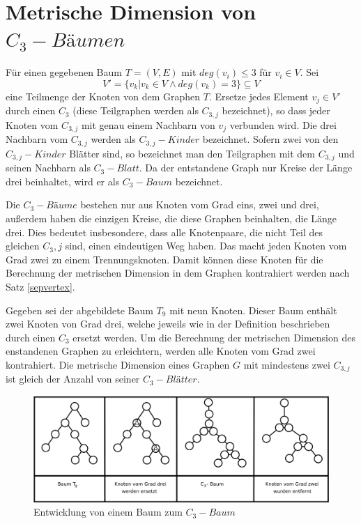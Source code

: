 \section{Metrische Dimension von $C_3-Bäumen$}
\begin{defi}
\label{C_{3} tree}
Für einen gegebenen Baum $T=(V,E)$ mit $deg(v_i)\leq 3$ für $v_i \in V$. Sei $$V'=\{v_k|v_k \in V \wedge deg(v_k)=3\}\subseteq V$$ eine Teilmenge der Knoten von dem Graphen $T$. Ersetze jedes Element $v_j \in V'$ durch einen $C_3$ (diese Teilgraphen werden als \emph{$C_{3,j}$} bezeichnet), so dass jeder Knoten vom $C_{3,j}$ mit genau einem Nachbarn von $v_j$ verbunden wird. Die drei Nachbarn vom $C_{3,j}$ werden als \emph{$C_{3,j}-Kinder$} bezeichnet. Sofern zwei von den $C_{3,j}-Kinder$ Blätter sind, so bezeichnet man den Teilgraphen mit dem $C_{3,j}$ und seinen Nachbarn als \emph{$C_{3}-Blatt$}. Da der entstandene Graph nur Kreise der Länge drei beinhaltet, wird er als \emph{$C_3-Baum$} bezeichnet. 
   \end{defi}
   \begin{bem}
Die $C_3-Bäume$ bestehen nur aus Knoten vom Grad eins, zwei und drei, außerdem haben die einzigen Kreise, die diese Graphen beinhalten, die Länge drei. Dies bedeutet insbesondere, dass alle Knotenpaare, die nicht Teil des gleichen $C_3,j$ sind, einen eindeutigen Weg haben. Das macht jeden Knoten vom Grad zwei zu einem Trennungsknoten. Damit können diese Knoten für die Berechnung der metrischen Dimension in dem Graphen kontrahiert werden nach Satz \ref{sepvertex}.
\end{bem} 
\begin{bsp} Gegeben sei der abgebildete Baum $T_9$ mit neun Knoten. Dieser Baum enthält zwei Knoten von Grad drei, welche jeweils wie in der Definition beschrieben durch einen $C_3$ ersetzt werden. Um die Berechnung der metrischen Dimension des enstandenen Graphen zu erleichtern, werden alle Knoten vom Grad zwei kontrahiert.
Die metrische Dimension eines Graphen $G$ mit mindestens zwei $C_{3,j}$ ist gleich der Anzahl von seiner $C_{3}-Blätter$.
\begin{figure}[h!]
		\centering 		 
   \includegraphics[width=350pt]{bilder/trees.pdf}
	\caption{Entwicklung von einem Baum zum $C_{3}-Baum$}
  	 \end{figure}
\end{bsp} 
